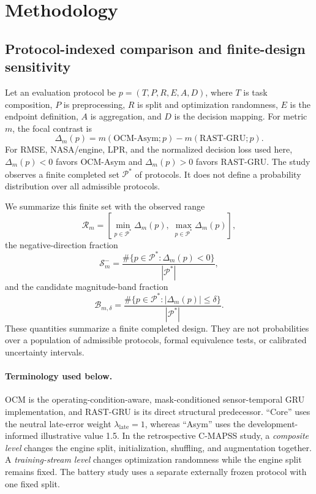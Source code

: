 \documentclass[preprint,12pt,numbers,sort&compress]{elsarticle}
\begin{document}
\FloatBarrier

\section{Methodology}

\subsection{Protocol-indexed comparison and finite-design sensitivity}

Let an evaluation protocol be $p=(T,P,R,E,A,D)$, where $T$ is task composition, $P$ is preprocessing, $R$ is split and optimization randomness, $E$ is the endpoint definition, $A$ is aggregation, and $D$ is the decision mapping. For metric $m$, the focal contrast is
\begin{equation}
\Delta_m(p)=m(\mathrm{OCM\mbox{-}Asym};p)-m(\mathrm{RAST\mbox{-}GRU};p).
\label{eq:protocol-contrast}
\end{equation}
For RMSE, NASA/engine, LPR, and the normalized decision loss used here, $\Delta_m(p)<0$ favors OCM-Asym and $\Delta_m(p)>0$ favors RAST-GRU. The study observes a finite completed set $\mathcal{P}^{*}$ of protocols. It does not define a probability distribution over all admissible protocols.

We summarize this finite set with the observed range
\begin{equation}
\mathcal{R}_m=\left[\min_{p\in\mathcal{P}^{*}}\Delta_m(p),\;\max_{p\in\mathcal{P}^{*}}\Delta_m(p)\right],
\end{equation}
the negative-direction fraction
\begin{equation}
\mathcal{S}^{-}_m=\frac{\#\{p\in\mathcal{P}^{*}:\Delta_m(p)<0\}}{|\mathcal{P}^{*}|},
\end{equation}
and the candidate magnitude-band fraction
\begin{equation}
\mathcal{B}_{m,\delta}=\frac{\#\{p\in\mathcal{P}^{*}:|\Delta_m(p)|\leq\delta\}}{|\mathcal{P}^{*}|}.
\end{equation}
These quantities summarize a finite completed design. They are not probabilities over a population of admissible protocols, formal equivalence tests, or calibrated uncertainty intervals.

\paragraph{Terminology used below.}
OCM is the operating-condition-aware, mask-conditioned sensor-temporal GRU implementation, and RAST-GRU is its direct structural predecessor. ``Core'' uses the neutral late-error weight $\lambda_{\mathrm{late}}=1$, whereas ``Asym'' uses the development-informed illustrative value 1.5. In the retrospective C-MAPSS study, a \emph{composite level} changes the engine split, initialization, shuffling, and augmentation together. A \emph{training-stream level} changes optimization randomness while the engine split remains fixed. The battery study uses a separate externally frozen protocol with one fixed split.
\end{document}
